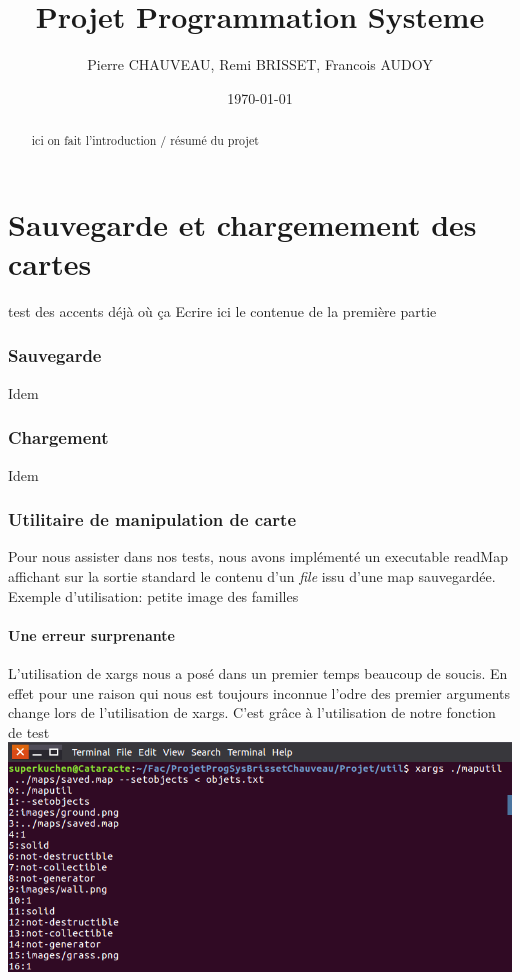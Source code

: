 \documentclass[a4paper]{article}
\title{Projet Programmation Systeme}
\author{Pierre CHAUVEAU, Remi BRISSET, Francois AUDOY}
\date{\today} %
\begin{document}
\maketitle


\begin{abstract}
  ici on fait l'introduction / résumé du projet
\end {abstract}

\part{Sauvegarde et chargemement des cartes}

test des accents déjà où ça
Ecrire ici le contenue de la première partie
\section{Sauvegarde}
Idem

\section{Chargement}
Idem

\section{Utilitaire de manipulation de carte}
Pour nous assister dans nos tests, nous avons implémenté un executable readMap affichant sur la sortie standard le contenu d'un \emph{file} issu d'une map sauvegardée.
Exemple d'utilisation:
petite image des familles 

\subsection{Une erreur surprenante}
L'utilisation de xargs nous a posé dans un premier temps beaucoup de soucis. En effet pour une raison qui nous est toujours inconnue l'odre des premier arguments change lors de l'utilisation de xargs. C'est grâce à l'utilisation de notre fonction de test %
\\
\includegraphics[scale=0.5]{erreurArgs.png}
\end{document}
